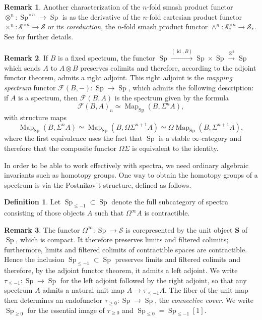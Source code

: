 \documentclass[12pt]{article}
\theoremstyle{definition}
\newtheorem{definition}{Definition}[subsection]
\newtheorem{remark}{Remark}[subsection]
\newcommand{\F}{\mathcal{F}}
\renewcommand{\S}{\mathcal{S}}
\renewcommand{\SS}{\mathbf{S}}
\renewcommand{\i}{\infty}
\newcommand{\too}{\longrightarrow}
\DeclareMathOperator{\id}{id}
\DeclareMathOperator{\Map}{Map}
\DeclareMathOperator{\Sp}{Sp}
\begin{document}
\begin{remark}
Another characterization of the $n$-fold smash product functor $\otimes^n:\Sp^{\times n}\to\Sp$ is as the derivative of the $n$-fold cartesian product functor $\times^n:\S^{\times n}\to\S$ or its {\em coreduction}, the $n$-fold smash product functor $\land^n:\S_*^{\times n}\to\S_*$.
See \cite[Example 6.2.3.28]{HA} for further details.
\end{remark}

\begin{remark}
If $B$ is a fixed spectrum, the functor
$
\Sp\overset{(\id,B)}\too\Sp\times\Sp\overset{\otimes^2}\too\Sp
$
which sends $A$ to $A\otimes B$ preserves colimits and therefore, according to the adjoint functor theorem, admits a right adjoint.
This right adjoint is the {\em mapping spectrum} functor $\F(B,-):\Sp\to\Sp$, which admits the following description: if $A$ is a spectrum, then $\F(B,A)$ is the spectrum given by the formula
\[
\F(B,A)_n\simeq\Map_{\Sp}(B,\Sigma^n A),
\]
with structure maps
\[
\Map_{\Sp}(B,\Sigma^n A)\simeq\Map_{\Sp}(B,\Omega\Sigma^{n+1}A)\simeq\Omega\Map_{\Sp}(B,\Sigma^{n+1}A),
\]
where the first equivalence uses the fact that $\Sp$ is a stable $\i$-category and therefore that the composite functor $\Omega\Sigma$ is equivalent to the identity.
\end{remark}


In order to be able to work effectively with spectra, we need ordinary algebraic invariants such as homotopy groups.
One way to obtain the homotopy groups of a spectrum is via the Postnikov t-structure, defined as follows.
\begin{definition}
Let $\Sp_{\leq -1}\subset\Sp$ denote the full subcategory of spectra consisting of those objects $A$ such that $\Omega^\infty A$ is contractible.
\end{definition}

\begin{remark}
The functor $\Omega^\infty\colon\Sp\to\S$ is corepresented by the unit object $\SS$ of $\Sp$, which is compact.
It therefore preserves limits and filtered colimits; furthermore, limits and filtered colimits of contractible spaces are contractible.
Hence the inclusion $\Sp_{\leq -1}\subset\Sp$ preserves limits and filtered colimits and therefore, by the adjoint functor theorem, it admits a left adjoint.
We write $\tau_{\leq -1}\colon\Sp\to\Sp$ for the left adjoint followed by the right adjoint, so that any spectrum $A$ admits a natural unit map $A\to\tau_{\leq -1} A$.
The fiber of the unit map then determines an endofunctor $\tau_{\geq 0}:\Sp\to\Sp$, the {\em connective cover}.
We write $\Sp_{\geq 0}$ for the essential image of $\tau_{\geq 0}$ and $\Sp_{\leq 0}=\Sp_{\leq -1}[1]$.
\end{remark}
\end{document}
